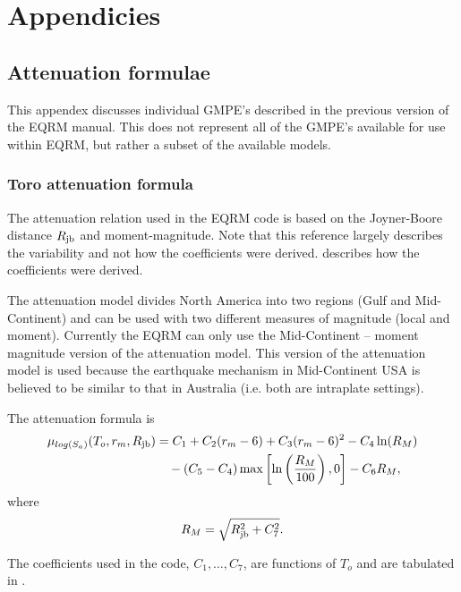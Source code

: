 \chapter{Appendicies}

\section{Attenuation formulae}
\label{app:GMPE_eqns}

This appendex discusses individual GMPE's described in the previous
version of the EQRM manual.  This does not represent all of the GMPE's
available for use within EQRM, but rather a subset of the available
models.


\subsection{Toro attenuation formula}

The \citet{dr_Toro97a} attenuation relation used in the EQRM code
is based on the Joyner-Boore distance $\Rjb$ and moment-magnitude.
Note that this reference largely describes the variability and not
how the coefficients were derived. \citet{dr_EPRI93a} describes
how the coefficients were derived.

The \citet{dr_Toro97a} attenuation model divides North America
into two regions (Gulf and Mid-Continent) and can  be used with
two different measures of magnitude (local and moment). Currently
the EQRM can only use the Mid-Continent -- moment magnitude
version of the attenuation model. This version of the attenuation
model is used because the earthquake mechanism in Mid-Continent
USA is believed to be similar to that in Australia (i.e. both are
intraplate settings).

The attenuation formula is
\begin{equation}
\begin{split}
\mu_{log(S_a)}(T_o,r_m,\Rjb) &= C_1 + C_2(r_m-6) + C_3(r_m-6)^2 - C_4\ln(R_M) \\
       &\quad  - (C_5-C_4)\max\left[\ln\left(\frac{R_M}{100}\right),0\right] -C_6R_M,
\end{split}
\end{equation}
where
\begin{equation}
 R_M = \sqrt{ \Rjb^2 + C_7^2 }.
\end{equation}

The coefficients used in the code, $C_1,\ldots,C_7$, are functions
of $T_o$ and are tabulated in \citet[Table 2]{dr_Toro97a}.


